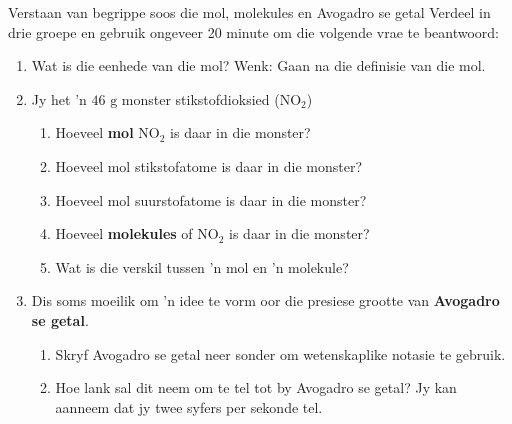             \begin{groupdiscussion}{Verstaan van begrippe soos die mol, molekules en Avogadro se getal
      }
            \nopagebreak
      \label{m38717*id279596}Verdeel in drie groepe en gebruik ongeveer 20 minute om die volgende vrae te beantwoord:
      \label{m38717*id279603}\begin{enumerate}[noitemsep, label=\textbf{\arabic*}. ] 
            \label{m38717*uid39}\item Wat is die eenhede van die mol? Wenk: Gaan na die definisie van die mol.
\label{m38717*uid40}\item Jy het 'n $46 \text{ g}$ monster stikstofdioksied ($\text{NO}_{2}$)
\label{m38717*id279631}\begin{enumerate}[noitemsep, label=\textbf{\alph*}. ] 
\item Hoeveel \textbf{mol} $\text{NO}_{2}$ is daar in die monster?
\item Hoeveel mol stikstofatome is daar in die monster?
\item Hoeveel mol suurstofatome is daar in die monster?
\item Hoeveel \textbf{molekules} of $\text{NO}_{2}$ is daar in die monster?
\item Wat is die verskil tussen 'n mol en 'n molekule?
\end{enumerate}
        \label{m38717*uid44}\item Dis soms moeilik om  'n idee te vorm oor die presiese grootte van \textbf{Avogadro se getal}.
\label{m38717*id279703}\begin{enumerate}[noitemsep, label=\textbf{\alph*}. ] 
            \label{m38717*uid45}\item Skryf Avogadro se getal neer sonder om wetenskaplike notasie te gebruik.
\label{m38717*uid46}\item Hoe lank sal dit neem om te tel tot by Avogadro se getal? Jy kan aanneem
              dat jy twee syfers per sekonde tel.
\end{enumerate}
        \end{enumerate}
\end{groupdiscussion}


